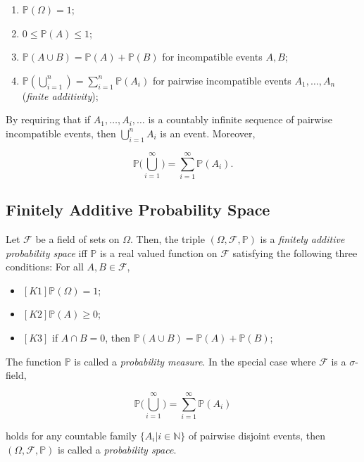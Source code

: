 \documentclass[12pt]{article}
\newcommand{\N}{\mathbb{N}}
\newcommand{\field}{\mathcal{F}}
\begin{document}
\begin{enumerate}[label=(\roman*)]
\item $\mathbb{P}(\Omega) = 1$;
\item $0 \leq \mathbb{P}(A) \leq 1$;
\item $\mathbb{P}(A \cup B) = \mathbb{P}(A) + \mathbb{P}(B)$ for incompatible events $A,B$;
\item $\mathbb{P}(\bigcup_{i=1}^{n}) = \sum_{i=1}^{n} \mathbb{P}(A_i)$ for pairwise incompatible events $A_1, \ldots, A_n$ (\textit{finite additivity});
\end{enumerate}

\noindent
By requiring that if $A_1, \ldots, A_i, \ldots$ is a countably infinite sequence of pairwise incompatible events, then $\bigcup_{i=1}^{n} A_i$ is an event. Moreover, 

\begin{equation}
\mathbb{P} \big ( \bigcup_{i=1}^{\infty} \big ) = \sum_{i=1}^{\infty} \mathbb{P}(A_i).
\end{equation}

\subsection*{Finitely Additive Probability Space}
Let $\field$ be a field of sets on $\Omega$. Then, the triple $(\Omega, \field, \mathbb{P})$ is a \textit{finitely additive probability space} iff $\mathbb{P}$ is a real valued function on $\field$ satisfying the following three conditions: For all $A,B \in \field$,

\begin{itemize}
\item $[K1] \mathbb{P}(\Omega) = 1$;
\item $[K2] \mathbb{P}(A) \geq 0$;
\item $[K3]$ if $A \cap B = 0$, then $\mathbb{P}(A \cup B) = \mathbb{P}(A) + \mathbb{P}(B)$;
\end{itemize}

\noindent
The function $\mathbb{P}$ is called a \textit{probability measure}. In the special case where $\field$ is a $\sigma$-field, 

\begin{equation}
\mathbb{P} \big ( \bigcup_{i=1}^{\infty} \big ) = \sum_{i=1}^{\infty} \mathbb{P}(A_i)
\end{equation}

\noindent
holds for any countable family $\big \{ A_i \lvert i \in \N \big \}$ of pairwise disjoint events, then $(\Omega, \field, \mathbb{P})$ is called a \textit{probability space}. \\
\end{document}
